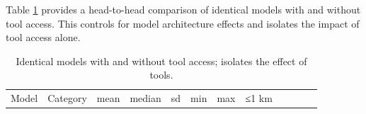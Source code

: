 Table \ref{tbl:tool_direct_comparison} provides a head-to-head
comparison of identical models with and without tool access. This
controls for model architecture effects and isolates the impact of tool
access alone.

\begin{longtable}[]{@{}
  >{\raggedright\arraybackslash}p{}
  >{\raggedright\arraybackslash}p{}
  >{\raggedright\arraybackslash}p{}
  >{\raggedright\arraybackslash}p{}
  >{\raggedright\arraybackslash}p{}
  >{\raggedright\arraybackslash}p{}
  >{\raggedright\arraybackslash}p{}
  >{\raggedright\arraybackslash}p{}
  >{\raggedright\arraybackslash}p{}
  >{\raggedright\arraybackslash}p{}
  >{\raggedright\arraybackslash}p{}
  >{\raggedright\arraybackslash}p{}@{}}
\caption{\label{tbl:tool_direct_comparison}Identical models with and
without tool access; isolates the effect of tools.}\tabularnewline
\toprule\noalign{}
\begin{minipage}[b]{\linewidth}\raggedright
Model
\end{minipage} & \begin{minipage}[b]{\linewidth}\raggedright
Category
\end{minipage} & \begin{minipage}[b]{\linewidth}\raggedright
mean
\end{minipage} & \begin{minipage}[b]{\linewidth}\raggedright
median
\end{minipage} & \begin{minipage}[b]{\linewidth}\raggedright
sd
\end{minipage} & \begin{minipage}[b]{\linewidth}\raggedright
min
\end{minipage} & \begin{minipage}[b]{\linewidth}\raggedright
max
\end{minipage} & \begin{minipage}[b]{\linewidth}\raggedright
≤1 km
\end{minipage} & \begin{minipage}[b]{\linewidth}\raggedright

\end{minipage}
\end{longtable}
